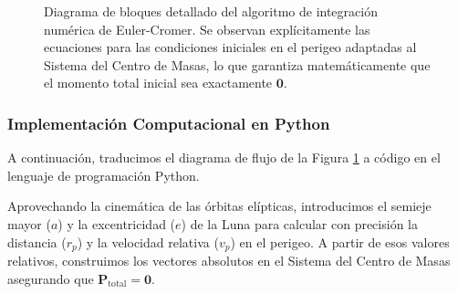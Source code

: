 \documentclass[11pt,a4paper]{book}
\begin{document}
\begin{figure}[htbp]
\caption{Diagrama de bloques detallado del algoritmo de integración numérica de Euler-Cromer. Se observan explícitamente las ecuaciones para las condiciones iniciales en el perigeo adaptadas al Sistema del Centro de Masas, lo que garantiza matemáticamente que el momento total inicial sea exactamente $\boldsymbol{0}$.}
\label{fig:diagrama_orbita_perigeo}
\end{figure}

\subsubsection{Implementación Computacional en Python}

A continuación, traducimos el diagrama de flujo de la Figura \ref{fig:diagrama_orbita_perigeo} a código en el lenguaje de programación Python. 

Aprovechando la cinemática de las órbitas elípticas, introducimos el semieje mayor ($a$) y la excentricidad ($e$) de la Luna para calcular con precisión la distancia ($r_p$) y la velocidad relativa ($v_p$) en el perigeo. A partir de esos valores relativos, construimos los vectores absolutos en el Sistema del Centro de Masas asegurando que $\boldsymbol{P}_{\text{total}} = \boldsymbol{0}$.
\end{document}
